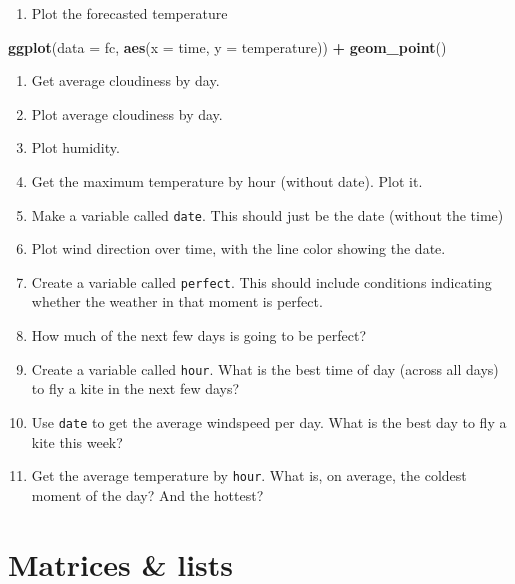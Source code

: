 \documentclass[
]{book}
\newenvironment{Shaded}{\begin{snugshade}}{\end{snugshade}}
\newcommand{\DataTypeTok}[1]{\textcolor[rgb]{0.13,0.29,0.53}{#1}}
\newcommand{\KeywordTok}[1]{\textcolor[rgb]{0.13,0.29,0.53}{\textbf{#1}}}
\newcommand{\NormalTok}[1]{#1}
\newcommand{\OperatorTok}[1]{\textcolor[rgb]{0.81,0.36,0.00}{\textbf{#1}}}
\newcommand{\StringTok}[1]{\textcolor[rgb]{0.31,0.60,0.02}{#1}}
\providecommand{\tightlist}{%
  \setlength{\itemsep}{0pt}\setlength{\parskip}{0pt}}
\begin{document}
\begin{enumerate}
\def\labelenumi{\arabic{enumi}.}
\tightlist
\item
  Plot the forecasted temperature
\end{enumerate}

\begin{Shaded}
\begin{Highlighting}[]
\KeywordTok{ggplot}\NormalTok{(}\DataTypeTok{data =}\NormalTok{ fc,}
       \KeywordTok{aes}\NormalTok{(}\DataTypeTok{x =}\NormalTok{ time,}
           \DataTypeTok{y =}\NormalTok{ temperature)) }\OperatorTok{+}
\StringTok{  }\KeywordTok{geom_point}\NormalTok{()}
\end{Highlighting}
\end{Shaded}

\begin{enumerate}
\def\labelenumi{\arabic{enumi}.}
\setcounter{enumi}{1}
\item
  Get average cloudiness by day.
\item
  Plot average cloudiness by day.
\item
  Plot humidity.
\item
  Get the maximum temperature by hour (without date). Plot it.
\item
  Make a variable called \texttt{date}. This should just be the date (without the time)
\item
  Plot wind direction over time, with the line color showing the date.
\item
  Create a variable called \texttt{perfect}. This should include conditions indicating whether the weather in that moment is perfect.
\item
  How much of the next few days is going to be perfect?
\item
  Create a variable called \texttt{hour}. What is the best time of day (across all days) to fly a kite in the next few days?
\item
  Use \texttt{date} to get the average windspeed per day. What is the best day to fly a kite this week?
\item
  Get the average temperature by \texttt{hour}. What is, on average, the coldest moment of the day? And the hottest?
\end{enumerate}

\hypertarget{matrices-lists}{%
\chapter{Matrices \& lists}\label{matrices-lists}}
\end{document}
